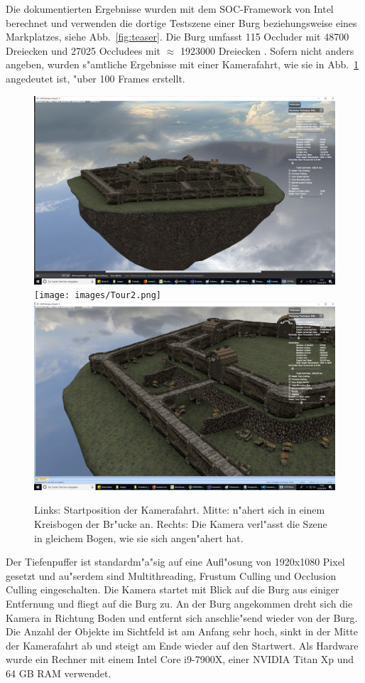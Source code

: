 \documentclass[journal]{vgtc}
\begin{document}
Die dokumentierten Ergebnisse wurden mit dem SOC-Framework von Intel berechnet und verwenden die dortige Testszene einer Burg beziehungsweise eines Markplatzes, siehe Abb.\ \ref{fig:teaser}. Die Burg umfasst 115 Occluder mit 48700 Dreiecken und 27025  Occludees mit $\approx$ 1923000 Dreiecken \cite{MSOC}. Sofern nicht anders angeben, wurden s"amtliche Ergebnisse mit einer Kamerafahrt, wie sie in Abb.\ \ref{fig:fahrt} angedeutet ist, "uber 100 Frames erstellt.
\begin{figure}%
\includegraphics[width=0.33\columnwidth]{images/Tour1.png}%
\texttt{[image: images/Tour2.png]}%
\includegraphics[width=0.33\columnwidth]{images/Tour3.png}%
\caption{Links: Startposition der Kamerafahrt. Mitte: n"ahert sich in einem Kreisbogen der Br"ucke an. Rechts: Die Kamera verl"asst die Szene in gleichem Bogen, wie sie sich angen"ahert hat.}%
\label{fig:fahrt}%
\end{figure}
Der Tiefenpuffer ist standardm"a"sig auf eine Aufl"osung von 1920x1080 Pixel gesetzt und au"serdem sind Multithreading, Frustum Culling und Occlusion Culling eingeschalten. Die Kamera startet mit Blick auf die Burg aus einiger Entfernung und fliegt auf die Burg zu. An der Burg angekommen dreht sich die Kamera in Richtung Boden und entfernt sich anschlie"send wieder von der Burg. Die Anzahl der Objekte im Sichtfeld ist am Anfang sehr hoch, sinkt in der Mitte der Kamerafahrt ab und steigt am Ende wieder auf den Startwert. Als Hardware wurde ein Rechner mit einem Intel Core i9-7900X, einer NVIDIA Titan Xp und 64 GB RAM verwendet.\\
\end{document}
